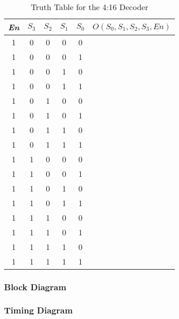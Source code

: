 		\begin{table}[H]
    			\centering
    			\begin{tabular}{|c|c|c|c|c|c|}
    			\hline
    			\hline
        			\textit{En} & $S_3$ & $S_2$ & $S_1$ & $S_0$ & $O(S_0, S_1, S_2, S_3, En)$ \\         			
        			\hline
        			\hline
        			1 & 0 & 0 & 0 & 0 & ~ \\
        			\hline 
        			1 & 0 & 0 & 0 & 1 & ~ \\ 
        			\hline 
        			1 & 0 & 0 & 1 & 0 & ~ \\ 
        			\hline 
        			1 & 0 & 0 & 1 & 1 & ~ \\ 
        			\hline 
        			1 & 0 & 1 & 0 & 0 & ~ \\ 
        			\hline 
        			1 & 0 & 1 & 0 & 1 & ~ \\ 
        			\hline 
        			1 & 0 & 1 & 1 & 0 & ~ \\ 
        			\hline 
        			1 & 0 & 1 & 1 & 1 & ~ \\ 
        			\hline 
       			1 & 1 & 0 & 0 & 0 & ~ \\ 
        			\hline 
        			1 & 1 & 0 & 0 & 1 & ~ \\ 
        			\hline 
        			1 & 1 & 0 & 1 & 0 & ~ \\ 
        			\hline 
        			1 & 1 & 0 & 1 & 1 & ~ \\ 
        			\hline 
        			1 & 1 & 1 & 0 & 0 & ~ \\ 
        			\hline 
        			1 & 1 & 1 & 0 & 1 & ~ \\ 
        			\hline 
        			1 & 1 & 1 & 1 & 0 & ~ \\ 
        			\hline 
        			1 & 1 & 1 & 1 & 1 & ~ \\ 
        			\hline
        			\hline
    			\end{tabular}
    			\caption{Truth Table for the 4:16 Decoder}
			\end{table}
	
	\subsubsection{{Block Diagram}}
	
		{}
	
	\subsubsection{{Timing Diagram}}
	
		{}

